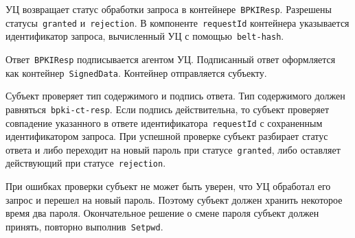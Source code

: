 УЦ возвращает статус обработки запроса в контейнере~\texttt{BPKIResp}.
Разрешены статусы~\texttt{granted} и~\texttt{rejection}.
В компоненте~\texttt{requestId} контейнера указывается идентификатор 
запроса, вычисленный УЦ с помощью~\texttt{belt-hash}.

Ответ~\texttt{BPKIResp} подписывается агентом УЦ. 
Подписанный ответ оформляется как контейнер~\texttt{SignedData}. Контейнер 
отправляется субъекту.

Субъект проверяет тип содержимого и подпись ответа. Тип содержимого должен
равняться~\texttt{bpki-ct-resp}. Если подпись действительна, то субъект
проверяет совпадение указанного в ответе идентификатора~\texttt{requestId}
с сохраненным идентификатором запроса. При успешной проверке субъект
разбирает статус ответа и либо переходит на новый пароль при
статусе~\texttt{granted}, либо оставляет действующий при
статусе~\texttt{rejection}.

При ошибках проверки субъект не может быть уверен, что УЦ обработал
его запрос и перешел на новый пароль. Поэтому субъект должен хранить  
некоторое время два пароля. Окончательное решение о смене пароля 
субъект должен принять, повторно выполнив~\texttt{Setpwd}.
